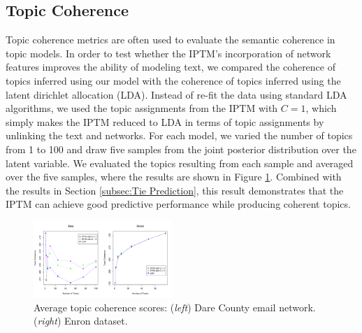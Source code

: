 \documentclass{article}
\begin{document}
\subsection{Topic Coherence}\label{subsec:Topic Coherence}
Topic coherence metrics \cite{mimno2011optimizing} are often used to evaluate the semantic coherence in topic models. In order to test whether the IPTM's incorporation of network features improves the ability of modeling text, we compared the coherence of topics inferred using our model with the coherence of topics inferred using the latent dirichlet allocation (LDA). Instead of re-fit the data using standard LDA algorithms, we used the topic assignments from the IPTM with $C=1$, which simply makes the IPTM reduced to LDA in terms of topic assignments by unlinking the text and networks. For each model, we varied the number of topics from 1 to 100 and draw five samples from the joint posterior distribution over the latent variable. We evaluated the topics resulting from each sample and averaged over the five samples, where the results are shown in Figure \ref{fig:topic}. Combined with the results in Section \ref{subsec:Tie Prediction}, this result demonstrates that the IPTM can achieve good predictive performance while producing coherent topics. 
\begin{figure}[h]
	\centering
	\includegraphics[width = 0.47\textwidth]{plots/topic_coherence-1.png}
	\caption{Average topic coherence scores: (\textit{left}) Dare County email network. (\textit{right}) Enron dataset.}
	\label{fig:topic}
\end{figure}
\end{document}
